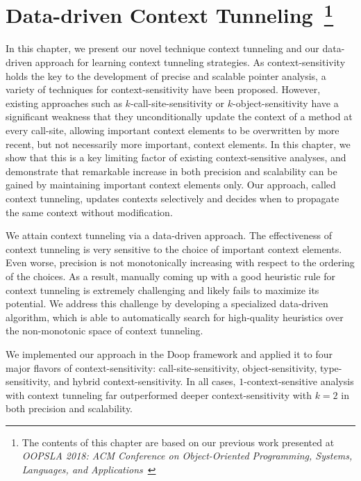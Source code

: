\chapter{Data-driven Context Tunneling~\footnote{The contents of this chapter are based on our previous work presented at \emph{OOPSLA 2018: ACM Conference on Object-Oriented Programming, Systems, Languages, and Applications}~\cite{JeJeOh18}}}\label{sec:Tunneling}
  In this chapter, we present our novel technique context tunneling and our data-driven approach for learning context tunneling strategies.
  As context-sensitivity holds the key to the development
  of precise and scalable pointer analysis, a variety of techniques
  for context-sensitivity have been proposed. However, existing
  approaches such as $k$-call-site-sensitivity or $k$-object-sensitivity have a
  significant weakness that they unconditionally update the context of a
  method at every call-site, allowing important context elements to be
  overwritten by more recent, but not necessarily more important,
  context elements. In this chapter, we show that this is a key limiting factor of
  existing context-sensitive analyses, and demonstrate that remarkable increase in
  both precision and scalability can be gained by
  maintaining important context elements only.
  Our approach, called context tunneling, updates contexts selectively
  and decides when to propagate the same context without
  modification.



  We attain context tunneling via a data-driven approach.  The
  effectiveness of context tunneling is very sensitive to the choice
  of important context elements. Even worse, precision is not
  monotonically increasing with respect to the ordering of the
  choices. As a result, manually coming up with a good heuristic rule
  for context tunneling is extremely challenging and likely fails to
  maximize its potential. We address this challenge by developing a
  specialized data-driven algorithm, which is able to automatically
  search for high-quality heuristics over the non-monotonic space of
  context tunneling.

  We implemented our approach in the Doop framework and applied it to
  four major flavors of context-sensitivity: call-site-sensitivity,
  object-sensitivity, type-sensitivity, and hybrid context-sensitivity. In
  all cases, $1$-context-sensitive analysis with context
  tunneling far outperformed deeper context-sensitivity with $k=2$ in
  both precision and scalability.


